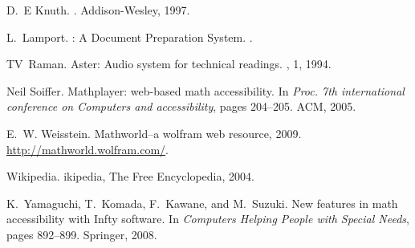 \documentclass{sig-alternate}
\begin{document}
\begin{thebibliography}{10}
D.~E Knuth.
.
\newblock Addison-Wesley, 1997.

L.~Lamport.
\newblock {\LaTeX}: A Document Preparation System.
.

TV~Raman.
\newblock Aster: Audio system for technical readings.
, 1, 1994.

Neil Soiffer.
\newblock Mathplayer: web-based math accessibility.
\newblock In {\em Proc. 7th international conference
  on Computers and accessibility}, pages 204--205. ACM, 2005.

E.~W. Weisstein.
\newblock Mathworld--a wolfram web resource, 2009.
\newblock \url{http://mathworld.wolfram.com/}.

Wikipedia.
ikipedia{,} {The Free Encyclopedia}, 2004.

K.~Yamaguchi, T.~Komada, F.~Kawane, and M.~Suzuki.
\newblock New features in math accessibility with Infty software.
\newblock In {\em Computers Helping People with Special Needs}, pages 892--899.
  Springer, 2008.

\end{thebibliography}
\end{document}
